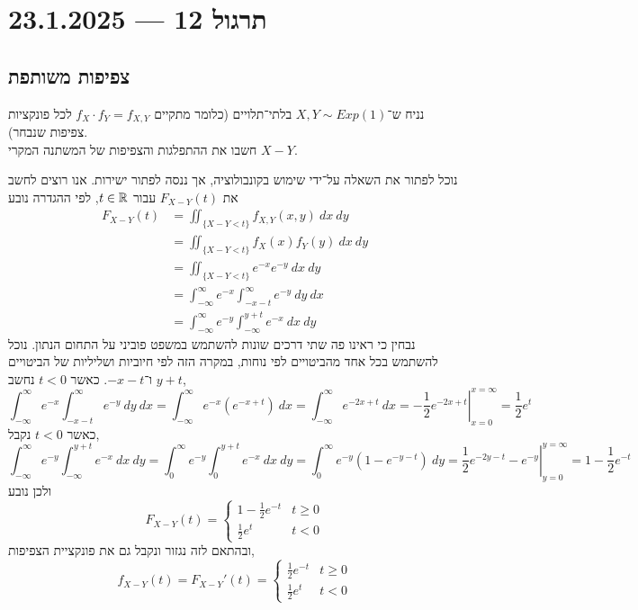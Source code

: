 \section{תרגול 12 --- 23.1.2025}
\subsection{צפיפות משותפת}
\begin{exercise}
	נניח ש־$X, Y \sim Exp(1)$ בלתי־תלויים (כלומר מתקיים $f_X \cdot f_Y = f_{X, Y}$ לכל פונקציות צפיפות שנבחר). \\
	חשבו את ההתפלגות והצפיפות של המשתנה המקרי $X - Y$.
\end{exercise}
\begin{solution}
	נוכל לפתור את השאלה על־ידי שימוש בקונבולוציה, אך ננסה לפתור ישירות.
	אנו רוצים לחשב את $F_{X - Y}(t)$ עבור $t \in \mathbb{R}$, לפי ההגדרה נובע
	\begin{align*}
		F_{X - Y}(t)
		& = \iint_{\{X - Y < t\}} f_{X, Y}(x, y)\ dx\ dy \\
		& = \iint_{\{X - Y < t\}} f_X(x) f_Y(y)\ dx\ dy \\
		& = \iint_{\{X - Y < t\}} e^{-x} e^{-y}\ dx\ dy \\
		& = \int_{-\infty}^{\infty} e^{-x} \int_{-x - t}^{\infty} e^{-y}\ dy\ dx \\
		& = \int_{-\infty}^{\infty} e^{-y} \int_{-\infty}^{y + t} e^{-x}\ dx\ dy
	\end{align*}
	נבחין כי ראינו פה שתי דרכים שונות להשתמש במשפט פוביני על התחום הנתון.
	נוכל להשתמש בכל אחד מהביטויים לפי נוחות, במקרה הזה לפי חיוביות ושליליות של הביטויים $y + t$ ו־$-x - t$.
	כאשר $t < 0$ נחשב,
	\[
		\int_{-\infty}^{\infty} e^{-x} \int_{-x - t}^{\infty} e^{-y}\ dy\ dx
		= \int_{-\infty}^{\infty} e^{-x} (e^{-x + t})\ dx
		= \int_{-\infty}^{\infty} e^{-2x + t}\ dx
		= \left. -\frac{1}{2} e^{-2x + t} \right\rvert_{x = 0}^{x = \infty}
		= \frac{1}{2} e^t
	\]
	כאשר $t < 0$ נקבל,
	\[
		\int_{-\infty}^{\infty} e^{-y} \int_{-\infty}^{y + t} e^{-x}\ dx\ dy
		= \int_{0}^{\infty} e^{-y} \int_{0}^{y + t} e^{-x}\ dx\ dy
		= \int_{0}^{\infty} e^{-y} (1 - e^{-y - t})\ dy
		= \left. \frac{1}{2} e^{-2y - t} - e^{-y} \right\rvert_{y = 0}^{y = \infty}
		= 1 - \frac{1}{2} e^{-t}
	\]
	ולכן נובע
	\[
		F_{X - Y}(t)
		= \begin{cases}
			1 - \frac{1}{2} e^{-t} & t \ge 0 \\
			\frac{1}{2} e^t & t < 0
		\end{cases}
	\]
	ובהתאם לזה נגזור ונקבל גם את פונקציית הצפיפות,
	\[
		f_{X - Y}(t)
		= F_{X - Y}'(t)
		= \begin{cases}
			\frac{1}{2} e^{-t} & t \ge 0 \\
			\frac{1}{2} e^t & t < 0
		\end{cases}
	\]
\end{solution}
